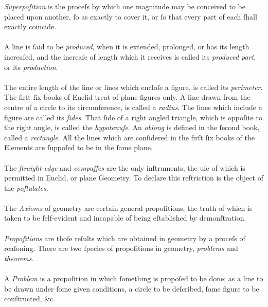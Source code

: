 \begin{minipage}{0.67\textwidth}
    \raggedright \textit{Superpoſition} is the proceſs by which one magnitude may be conceived to be placed upon another, ſo as exactly to cover it, or ſo that every part of each ſhall exactly coincide.\\
    \hfill\\
    A line is ſaid to be \textit{produced}, when it is extended, prolonged, or has its length increaſed, and the increaſe of length which it receives is called its \textit{produced part}, or its \textit{production}.\\
    \hfill\\
    The entire length of the line or lines which encloſe a figure, is called its \textit{perimeter}. The firſt ſix books of Euclid treat of plane figures only. A line drawn from the centre of a circle to its circumference, is called a \textit{radius}. The lines which include a figure are called its \textit{ſides}. That ſide of a right angled triangle, which is oppoſite to the right angle, is called the \textit{hypotenuſe}. An \textit{oblong} is defined in the ſecond book, called a \textit{rectangle}. All the lines which are conſidered in the firſt ſix books of the Elements are ſuppoſed to be in the ſame plane.\\
    \hfill\\
    The \textit{ſtraight-edge} and \textit{compaſſes} are the only inſtruments, the uſe of which is permitted in Euclid, or plane Geometry. To declare this reſtriction is the object of the \textit{poſtulates}.\\
    \hfill\\
    The \textit{Axioms} of geometry are certain general propoſitions, the truth of which is taken to be ſelf-evident and incapable of being eſtablished by demonſtration.\\
    \hfill\\
    \textit{Propoſitions} are thoſe reſults which are obtained in geometry by a proceſs of reaſoning. There are two ſpecies of propoſitions in geometry, \textit{problems} and \textit{theorems}.\\
    \hfill\\
    A \textit{Problem} is a propoſition in which ſomething is propoſed to be done; as a line to be drawn under ſome given conditions, a circle to be deſcribed, ſome figure to be conſtructed, \&c.\\
\end{minipage}%
\begin{minipage}{0.33\textwidth}
    \phantom{}
\end{minipage}

